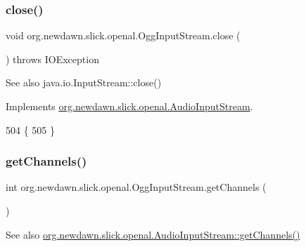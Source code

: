 \subsubsection{\texorpdfstring{close()}{close()}}
{\footnotesize\ttfamily void org.\+newdawn.\+slick.\+openal.\+Ogg\+Input\+Stream.\+close (\begin{DoxyParamCaption}{ }\end{DoxyParamCaption}) throws I\+O\+Exception\hspace{0.3cm}{\ttfamily [inline]}}

\begin{DoxySeeAlso}{See also}
java.\+io.\+Input\+Stream\+::close() 
\end{DoxySeeAlso}


Implements \mbox{\hyperlink{interfaceorg_1_1newdawn_1_1slick_1_1openal_1_1_audio_input_stream_a2b70decb677f0cc88365a689f4953eeb}{org.\+newdawn.\+slick.\+openal.\+Audio\+Input\+Stream}}.


\begin{DoxyCode}
504                                            \{
505     \}
\end{DoxyCode}
\mbox{\label{classorg_1_1newdawn_1_1slick_1_1openal_1_1_ogg_input_stream_a63a29d47878503e310d5ea4686751596}} 
\subsubsection{\texorpdfstring{get\+Channels()}{getChannels()}}
{\footnotesize\ttfamily int org.\+newdawn.\+slick.\+openal.\+Ogg\+Input\+Stream.\+get\+Channels (\begin{DoxyParamCaption}{ }\end{DoxyParamCaption})\hspace{0.3cm}{\ttfamily [inline]}}

\begin{DoxySeeAlso}{See also}
\mbox{\hyperlink{interfaceorg_1_1newdawn_1_1slick_1_1openal_1_1_audio_input_stream_a2bee5322dd7878c18fa8f16bd52bbdfa}{org.\+newdawn.\+slick.\+openal.\+Audio\+Input\+Stream\+::get\+Channels()}} 
\end{DoxySeeAlso}


